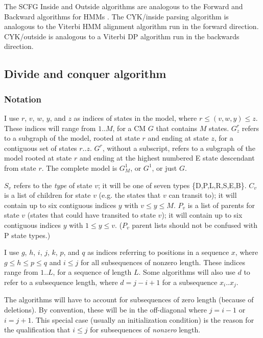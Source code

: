 \documentclass[11pt]{article}
\begin{document}
The SCFG Inside and Outside algorithms are analogous to the Forward
and Backward algorithms for HMMs \cite{Rabiner89,Durbin98}.  The
CYK/inside parsing algorithm is analogous to the Viterbi HMM alignment
algorithm run in the forward direction. CYK/outside is analogous to a
Viterbi DP algorithm run in the backwards direction.



\subsection{Divide and conquer algorithm}

\subsubsection{Notation}

I use $r$, $v$, $w$, $y$, and $z$ as indices of states in the model,
where $r \leq (v,w,y) \leq z$. These indices will range from $1..M$,
for a CM $G$ that contains $M$ states. $G^r_z$ refers to a subgraph of
the model, rooted at state $r$ and ending at state $z$, for a
contiguous set of states $r..z$. $G^r$, without a subscript, refers to
a subgraph of the model rooted at state $r$ and ending at the highest
numbered E state descendant from state $r$. The complete model is
$G^1_M$, or $G^1$, or just $G$.

$S_v$ refers to the \emph{type} of state $v$; it will be one of seven
types \{D,P,L,R,S,E,B\}. $C_v$ is a list of children for state $v$
(e.g. the states that $v$ can transit to); it will contain up to six
contiguous indices $y$ with $v \leq y \leq M$. $P_v$ is a list of
parents for state $v$ (states that could have transited to state $v$);
it will contain up to six contiguous indices $y$ with $1 \leq y \leq
v$. ($P_v$ parent lists should not be confused with P state types.)

I use $g$, $h$, $i$, $j$, $k$, $p$, and $q$ as indices referring to
positions in a sequence $x$, where $g \leq h \leq p \leq q$ and $i
\leq j$ for all subsequences of nonzero length. These indices range
from $1..L$, for a sequence of length $L$. Some algorithms will also
use $d$ to refer to a subsequence length, where $d = j-i+1$ for a
subsequence $x_i..x_j$.

The algorithms will have to account for subsequences of zero length
(because of deletions). By convention, these will be in the
off-diagonal where $j = i-1$ or $i = j+1$. This special case (usually
an initialization condition) is the reason for the qualification that
$i \leq j$ for subsequences of \emph{nonzero} length.
\end{document}
